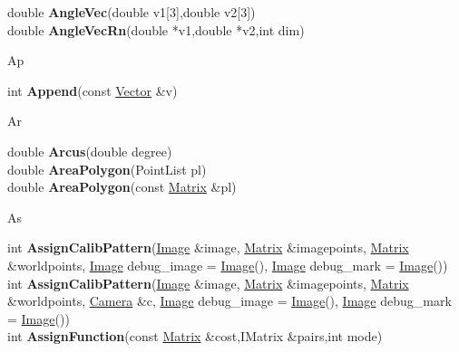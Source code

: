 \documentclass[10pt,titlepage]{article}
\def\functionlistentry#1#2#3#4#5#6{\noindent #1 {\bf #2}(#3) \dotfill #6\\}
\def\letterref#1{}
\def\letterlabel#1{\vspace{0.5cm}\centerline{\Large #1}}
\def\letterlabelend#1{}
\begin{document}
{{\letterref{Ac}
\letterref{Ad}
\letterref{Af}
\letterref{Al}
\letterref{An}
\letterref{Ap}
\letterref{Ar}
\letterref{As}
\letterlabelend{An}
\functionlistentry{double}{AngleVec}{double v1[3],double v2[3]}{1565}{obsolet}{}
\functionlistentry{double}{AngleVecRn}{double *v1,double *v2,int dim}{1573}{obsolet}{}

\letterlabel{Ap}
\letterref{A}
\letterref{B}
\letterref{C}
\letterref{D}
\letterref{E}
\letterref{F}
\letterref{G}
\letterref{H}
\letterref{I}
\letterref{K}
\letterref{L}
\letterref{M}
\letterref{N}
\letterref{O}
\letterref{P}
\letterref{Q}
\letterref{R}
\letterref{S}
\letterref{T}
\letterref{U}
\letterref{V}
\letterref{W}
\letterref{X}
\letterref{Y}
\letterref{Z}

\letterref{Ac}
\letterref{Ad}
\letterref{Af}
\letterref{Al}
\letterref{An}
\letterref{Ap}
\letterref{Ar}
\letterref{As}
\letterlabelend{Ap}
\functionlistentry{int}{Append}{const \hyperlink{Vector}{Vector} \&v}{266}{datastructures}{}

\letterlabel{Ar}
\letterref{A}
\letterref{B}
\letterref{C}
\letterref{D}
\letterref{E}
\letterref{F}
\letterref{G}
\letterref{H}
\letterref{I}
\letterref{K}
\letterref{L}
\letterref{M}
\letterref{N}
\letterref{O}
\letterref{P}
\letterref{Q}
\letterref{R}
\letterref{S}
\letterref{T}
\letterref{U}
\letterref{V}
\letterref{W}
\letterref{X}
\letterref{Y}
\letterref{Z}

\letterref{Ac}
\letterref{Ad}
\letterref{Af}
\letterref{Al}
\letterref{An}
\letterref{Ap}
\letterref{Ar}
\letterref{As}
\letterlabelend{Ar}
\functionlistentry{double}{Arcus}{double degree}{1348}{numeric}{}
\functionlistentry{double}{AreaPolygon}{PointList pl}{1379}{numeric}{}
\functionlistentry{double}{AreaPolygon}{const \hyperlink{Matrix}{Matrix} \&pl}{1380}{numeric}{}

\letterlabel{As}
\letterref{A}
\letterref{B}
\letterref{C}
\letterref{D}
\letterref{E}
\letterref{F}
\letterref{G}
\letterref{H}
\letterref{I}
\letterref{K}
\letterref{L}
\letterref{M}
\letterref{N}
\letterref{O}
\letterref{P}
\letterref{Q}
\letterref{R}
\letterref{S}
\letterref{T}
\letterref{U}
\letterref{V}
\letterref{W}
\letterref{X}
\letterref{Y}
\letterref{Z}

\letterref{Ac}
\letterref{Ad}
\letterref{Af}
\letterref{Al}
\letterref{An}
\letterref{Ap}
\letterref{Ar}
\letterref{As}
\letterlabelend{As}
\functionlistentry{int}{AssignCalibPattern}{\hyperlink{Image}{Image} \&image, \hyperlink{Matrix}{Matrix} \&imagepoints, \hyperlink{Matrix}{Matrix} \&worldpoints, \hyperlink{Image}{Image} debug\_image = \hyperlink{Image}{Image}(), \hyperlink{Image}{Image} debug\_mark = \hyperlink{Image}{Image}()}{794}{cameraModel}{}
\functionlistentry{int}{AssignCalibPattern}{\hyperlink{Image}{Image} \&image, \hyperlink{Matrix}{Matrix} \&imagepoints, \hyperlink{Matrix}{Matrix} \&worldpoints, \hyperlink{Camera}{Camera} \&c, \hyperlink{Image}{Image} debug\_image = \hyperlink{Image}{Image}(), \hyperlink{Image}{Image} debug\_mark = \hyperlink{Image}{Image}()}{795}{cameraModel}{}
\functionlistentry{int}{AssignFunction}{const \hyperlink{Matrix}{Matrix} \&cost,IMatrix \&pairs,int mode}{1261}{registration}{}

}}
\end{document}
